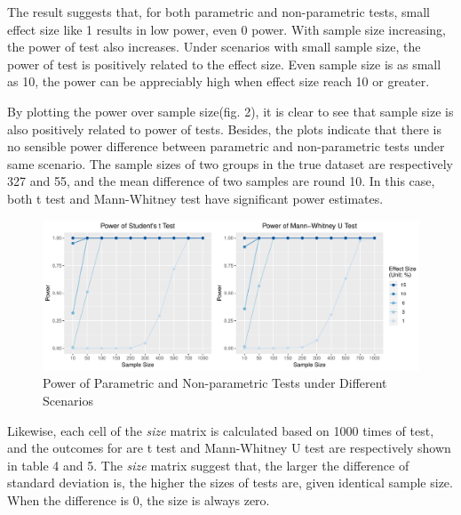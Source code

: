 \documentclass[]{article}
\begin{document}
The result suggests that, for both parametric and non-parametric tests,
small effect size like 1 results in low power, even 0 power. With sample
size increasing, the power of test also increases. Under scenarios with
small sample size, the power of test is positively related to the effect
size. Even sample size is as small as 10, the power can be appreciably
high when effect size reach 10 or greater.

By plotting the power over sample size(fig. 2), it is clear to see that
sample size is also positively related to power of tests. Besides, the
plots indicate that there is no sensible power difference between
parametric and non-parametric tests under same scenario. The sample
sizes of two groups in the true dataset are respectively 327 and 55, and
the mean difference of two samples are round 10. In this case, both t
test and Mann-Whitney test have significant power estimates.

\begin{figure}
\centering
\includegraphics{../figure/power.pdf}
\caption{Power of Parametric and Non-parametric Tests under Different
Scenarios}
\end{figure}

Likewise, each cell of the \emph{size} matrix is calculated based on
1000 times of test, and the outcomes for are t test and Mann-Whitney U
test are respectively shown in table 4 and 5. The \emph{size} matrix
suggest that, the larger the difference of standard deviation is, the
higher the sizes of tests are, given identical sample size. When the
difference is 0, the size is always zero.
\end{document}
